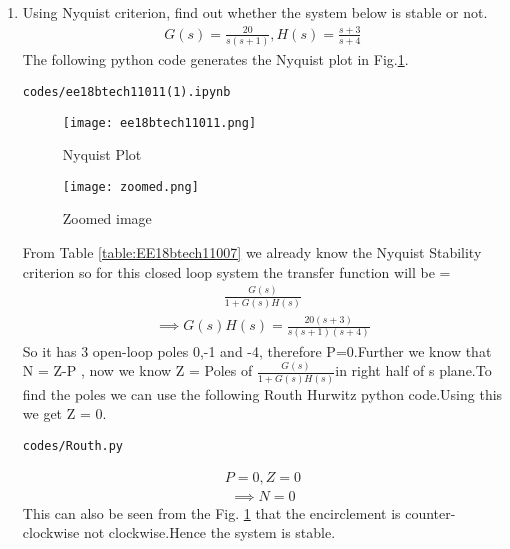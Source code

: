 \begin{enumerate}[label=\thesubsection.\arabic*.,ref=\thesubsection.\theenumi]
\item Using Nyquist criterion, find out whether the system below is stable or not.
\begin{align}
\label{eq:ee18btech11011_system}
 G(s)=\frac{20}{s(s+1)} , 
 H(s)=\frac{s+3}{s+4}
\end{align}
\solution The following python code generates the Nyquist plot in Fig.\ref{fig:ee18btech11011}.
\begin{lstlisting}
codes/ee18btech11011(1).ipynb
\end{lstlisting}
\begin{figure}[ht!]
  \texttt{[image: ee18btech11011.png]}
  \caption{Nyquist Plot}
  \label{fig:ee18btech11011}
\end{figure}
\begin{figure}[ht!]
  \texttt{[image: zoomed.png]}
  \caption{Zoomed image}
  \label{fig:zoomed}
\end{figure}
From Table \ref{table:EE18btech11007} we already know the Nyquist Stability criterion so for this closed loop system the transfer function will be =
\begin{align}
    \frac{G(s)}{1+G(s)H(s)}
\end{align}
\begin{align}
    \implies G(s)H(s)= \frac{20(s+3)}{s(s+1)(s+4)}
\end{align}
 So it has 3 open-loop poles 0,-1 and -4, therefore P=0.Further we know that N = Z-P , now we know Z = Poles of $\frac{G(s)}{1+G(s)H(s)}$in right half of s plane.To find the poles we can use the following Routh Hurwitz python code.Using this we get Z = 0.
 \begin{lstlisting}
codes/Routh.py
\end{lstlisting}
\begin{align}
    P = 0 , Z = 0
\end{align}
\begin{align}
    \implies N= 0
\end{align}
This can also be seen from the Fig. \ref{fig:ee18btech11011} that the encirclement is counter-clockwise not clockwise.Hence the system is stable.

\end{enumerate}

